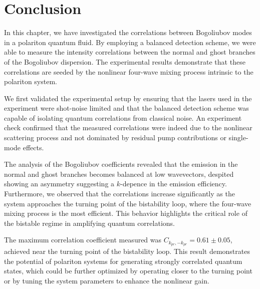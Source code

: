 \section{Conclusion}

In this chapter, we have investigated the correlations between Bogoliubov modes in a polariton quantum fluid. By employing a balanced detection scheme, we were able to measure the intensity correlations between the normal and ghost branches of the Bogoliubov dispersion. The experimental results demonstrate that these correlations are seeded by the nonlinear four-wave mixing process intrinsic to the polariton system.

We first validated the experimental setup by ensuring that the lasers used in the experiment were shot-noise limited and that the balanced detection scheme was capable of isolating quantum correlations from classical noise. An experiment check confirmed that the measured correlations were indeed due to the nonlinear scattering process and not dominated by residual pump contributions or single-mode effects.

The analysis of the Bogoliubov coefficients revealed that the emission in the normal and ghost branches becomes balanced at low wavevectors, despited showing an asymmetry suggesting a $k$-depence in the emission efficiency. Furthermore, we observed that the correlations increase significantly as the system approaches the turning point of the bistability loop, where the four-wave mixing process is the most efficient. This behavior highlights the critical role of the bistable regime in amplifying quantum correlations.

The maximum correlation coefficient measured was $C_{k_{pr},-k_{pr}} = 0.61 \pm 0.05$, achieved near the turning point of the bistability loop. This result demonstrates the potential of polariton systems for generating strongly correlated quantum states, which could be further optimized by operating closer to the turning point or by tuning the system parameters to enhance the nonlinear gain.


